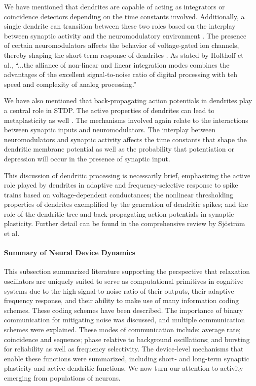 \documentclass[twocolumn]{article}
\begin{document}
We have mentioned that dendrites are capable of acting as integrators or coincidence detectors depending on the time constants involved. Additionally, a single dendrite can transition between these two roles based on the interplay between synaptic activity and the neuromodulatory environment \cite{hoko2006}. The presence of certain neuromodulators affects the behavior of voltage-gated ion channels, thereby shaping the short-term response of dendrites \cite{majo2005}. As stated by Holthoff et al., ``...the alliance of non-linear and linear integration modes combines the advantages of the excellent signal-to-noise ratio of digital processing with teh speed and complexity of analog processing.'' \cite{hoko2006} 

We have also mentioned that back-propagating action potentials in dendrites play a central role in STDP. The active properties of dendrites can lead to metaplasticity as well \cite{ab2008}. The mechanisms involved again relate to the interactions between synaptic inputs and neuromodulators. The interplay between neuromodulators and synaptic activity affects the time constants that shape the dendritic membrane potential as well as the probability that potentiation or depression will occur in the presence of synaptic input. 

This discussion of dendritic processing is necessarily brief, emphasizing the active role played by dendrites in adaptive and frequency-selective response to spike trains based on voltage-dependent conductances; the nonlinear thresholding properties of dendrites exemplified by the generation of dendritic spikes; and the role of the dendritic tree and back-propagating action potentials in synaptic plasticity. Further detail can be found in the comprehensive review by Sj\"{o}str\"{o}m et al. \cite{sjra2008}

\paragraph{Summary of Neural Device Dynamics}
This subsection summarized literature supporting the perspective that relaxation oscillators are uniquely suited to serve as computational primitives in cognitive systems due to the high signal-to-noise ratio of their outputs, their adaptive frequency response, and their ability to make use of many information coding schemes. These coding schemes have been described. The importance of binary communication for mitigating noise was discussed, and multiple communication schemes were explained. These modes of communication include: average rate; coincidence and sequence; phase relative to background oscillations; and bursting for reliability as well as frequency selectivity. The device-level mechanisms that enable these functions were summarized, including short- and long-term synaptic plasticity and active dendritic functions. We now turn our attention to activity emerging from populations of neurons.
\end{document}
